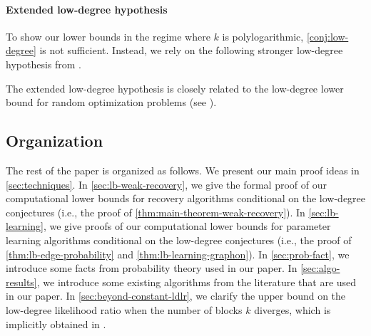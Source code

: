\paragraph{Extended low-degree hypothesis}
To show our lower bounds in the regime where $k$ is polylogarithmic, \cref{conj:low-degree} is not sufficient. Instead, we rely on the following stronger low-degree hypothesis from \cite{moitra2023precise}.
The extended low-degree hypothesis is closely related to the low-degree lower bound for random optimization problems (see \cite{gamarnik2020hardness}).

\subsection{Organization}
The rest of the paper is organized as follows.
We present our main proof ideas in \cref{sec:techniques}. 
In \cref{sec:lb-weak-recovery}, we give the formal proof of our computational lower bounds for recovery algorithms conditional on the low-degree conjectures (i.e., the proof of \cref{thm:main-theorem-weak-recovery}).
In \cref{sec:lb-learning}, we give proofs of our computational lower bounds for parameter learning algorithms conditional on the low-degree conjectures (i.e., the proof of \cref{thm:lb-edge-probability} and  \cref{thm:lb-learning-graphon}).
In \cref{sec:prob-fact}, we introduce some facts from probability theory used in our paper. 
In \cref{sec:algo-results}, we introduce some existing algorithms from the literature that are used in our paper. 
In \cref{sec:beyond-constant-ldlr}, we clarify the upper bound on the low-degree likelihood ratio when the number of blocks $k$ diverges, which is implicitly obtained in \cite{bandeira2021spectral}.